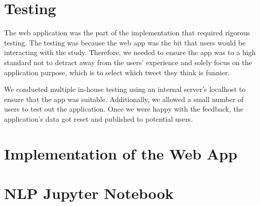 
\chapter{Testing}

The web application was the part of the implementation that required rigorous testing. The testing was because the web app was the bit that users would be interacting with the study. Therefore, we needed to ensure the app was to a high standard not to detract away from the users' experience and solely focus on the application purpose, which is to select which tweet they think is funnier. 

We conducted multiple in-house testing using an internal server's localhost to ensure that the app was suitable. Additionally, we allowed a small number of users to test out the application. Once we were happy with the feedback, the application's data got reset and published to potential users.

\chapter{Implementation of the Web App}
\label{app:implementation_algorithm}





\chapter{NLP Jupyter Notebook}
\label{app:jupyter_nb}
%


